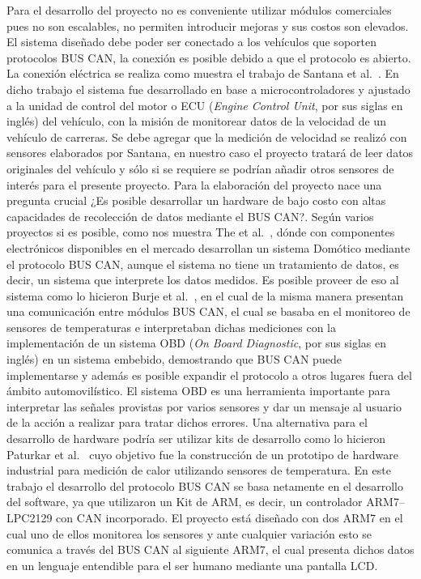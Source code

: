 Para el desarrollo del proyecto no es conveniente utilizar módulos comerciales pues no son escalables, no permiten introducir mejoras y sus costos son elevados. 
El sistema diseñado debe poder ser conectado a los vehículos que soporten protocolos BUS CAN, la conexión es posible debido a que el protocolo es abierto. 
La conexión eléctrica se realiza como muestra el trabajo de Santana et al.~\cite{DISM}. 
En dicho trabajo el sistema fue desarrollado en base a microcontroladores y ajustado a la unidad de control del motor o ECU (\textit{Engine Control Unit}, por sus siglas en inglés) del vehículo, con la misión de monitorear datos de la velocidad de un vehículo de carreras. 
Se debe agregar que la medición de velocidad se realizó con sensores elaborados por Santana, en nuestro caso el proyecto tratará de leer datos originales del vehículo y sólo si se requiere se podrían añadir otros sensores de interés para el presente proyecto. 
Para la elaboración del proyecto nace una pregunta crucial ¿Es posible desarrollar un hardware de bajo costo con altas capacidades de recolección de datos mediante el BUS CAN?.
Según varios proyectos si es posible,  como nos muestra The et al.~\cite{HAMS}, dónde con componentes electrónicos disponibles en el mercado desarrollan un sistema Domótico mediante el protocolo BUS CAN, aunque el sistema no tiene un tratamiento de datos, es decir, un sistema que interprete los datos medidos. 
Es posible proveer de eso al sistema como lo hicieron  Burje et al.~\cite{EOBD}, en el cual de la misma manera presentan una comunicación entre módulos BUS CAN, el cual se basaba en el monitoreo de sensores de temperaturas e interpretaban dichas mediciones con la implementación de un sistema OBD (\textit{On Board Diagnostic}, por sus siglas en inglés) en un sistema embebido, demostrando que BUS CAN puede implementarse y además es posible expandir el protocolo a otros lugares fuera del ámbito automovilístico. 
El sistema OBD es una herramienta importante para interpretar las señales provistas por varios sensores y dar un mensaje al usuario de la acción a realizar para tratar dichos errores. 
Una alternativa para el desarrollo de hardware podría ser utilizar kits de desarrollo como lo hicieron Paturkar et al.~\cite{AABT} cuyo objetivo fue la construcción de un prototipo de hardware industrial para medición de calor utilizando sensores de temperatura. 
En este trabajo el desarrollo del protocolo BUS CAN se basa netamente en el desarrollo del software, ya que utilizaron un Kit de ARM, es decir, un controlador ARM7–LPC2129 con CAN incorporado. 
El proyecto está diseñado con dos ARM7 en el cual uno de ellos monitorea los sensores y ante cualquier variación esto se comunica a través del BUS CAN al siguiente ARM7, el cual presenta dichos datos en un lenguaje entendible para el ser humano mediante una pantalla LCD. 
